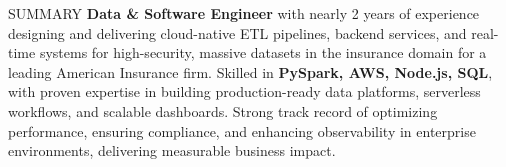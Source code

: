 \documentclass[10pt]{resume}
\begin{document}
\footnotesize

\begin{rSection}{SUMMARY}
\textbf{Data \& Software Engineer} with nearly 2 years of experience designing and delivering cloud-native ETL pipelines, backend services, and real-time systems for high-security,  massive datasets in the insurance domain for a leading American Insurance firm. Skilled in \textbf{PySpark, AWS, Node.js, SQL}, with proven expertise in building production-ready data platforms, serverless workflows, and scalable dashboards. Strong track record of optimizing performance, ensuring compliance, and enhancing observability in enterprise environments, delivering measurable business impact.
\end{rSection}

\end{document}
